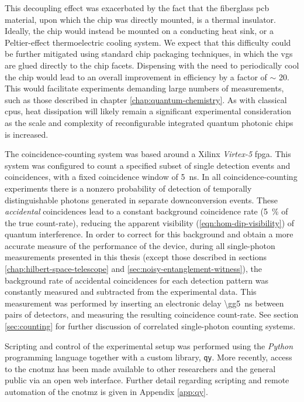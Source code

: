 This decoupling effect was exacerbated by the fact that the fiberglass \gls{pcb} material, upon which the chip was directly mounted, is a thermal insulator. 
Ideally, the chip would instead be mounted on a conducting heat sink, or a Peltier-effect thermoelectric cooling system.
We expect that this difficulty could be further mitigated using standard chip packaging techniques, in which the \glspl{vg} are glued directly to the chip facets. Dispensing with the need to periodically cool the chip would lead to an overall improvement in efficiency by a factor of $\sim$ 20.  
This would facilitate experiments demanding large numbers of measurements, such as those described in chapter \ref{chap:quantum-chemistry}.
As with classical \glspl{cpu}, heat dissipation will likely remain a significant experimental consideration as the scale and complexity of reconfigurable integrated quantum photonic chips is increased.

The coincidence-counting system was based around a Xilinx \emph{Virtex-5} \gls{fpga}. This system was configured to count a specified subset of single detection events and coincidences, with a fixed coincidence window of \SI{5}{\nano\second}. In all coincidence-counting experiments there is a nonzero probability of detection of temporally distinguishable photons generated in separate downconversion events. These \emph{accidental} coincidences lead to a constant background coincidence rate (\SI{5}{\percent} of the true count-rate), reducing the apparent visibility (\ref{eqn:hom-dip-visibility}) of quantum interference.  In order to correct for this background and obtain a more accurate measure of the performance of the device, during all single-photon measurements presented in this thesis (except those described in sections \ref{chap:hilbert-space-telescope} and \ref{sec:noisy-entanglement-witness}), the background rate of accidental coincidences for each detection pattern was constantly measured and subtracted from the experimental data. This measurement was performed by inserting an electronic delay \SI{\gg5}{\nano\second} between pairs of detectors, and measuring the resulting coincidence count-rate.
See section \ref{sec:counting} for further discussion of correlated single-photon counting systems.

Scripting and control of the experimental setup was performed using the \emph{Python} programming language together with a custom library, \texttt{qy}. 
More recently, access to the \gls{cnotmz} has been made available to other researchers and the general public via an open web interface. Further detail regarding scripting and remote automation of the \gls{cnotmz} is given in Appendix \ref{app:qy}.

